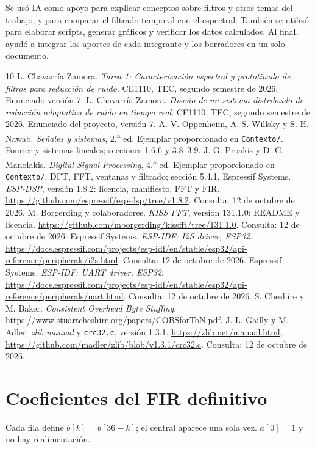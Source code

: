 \documentclass[11pt,a4paper]{article}
\newcommand{\ruta}[1]{\nolinkurl{#1}}
\begin{document}
Se usó IA como apoyo para explicar conceptos sobre filtros y otros temas del trabajo, y para comparar el filtrado temporal con el espectral. También se utilizó para elaborar scripts, generar gráficos y verificar los datos calculados. Al final, ayudó a integrar los aportes de cada integrante y los borradores en un solo documento.

\clearpage
\begin{thebibliography}{10}
 L. Chavarría Zamora. \emph{Tarea 1: Caracterización espectral y prototipado de filtros para reducción de ruido}. CE1110, TEC, segundo semestre de 2026. Enunciado versión 7.
 L. Chavarría Zamora. \emph{Diseño de un sistema distribuido de reducción adaptativa de ruido en tiempo real}. CE1110, TEC, segundo semestre de 2026. Enunciado del proyecto, versión 7.
 A. V. Oppenheim, A. S. Willsky y S. H. Nawab. \emph{Señales y sistemas}, 2.\textsuperscript{a} ed. Ejemplar proporcionado en \ruta{Contexto/}. Fourier y sistemas lineales; secciones 1.6.6 y 3.8--3.9.
 J. G. Proakis y D. G. Manolakis. \emph{Digital Signal Processing}, 4.\textsuperscript{a} ed. Ejemplar proporcionado en \ruta{Contexto/}. DFT, FFT, ventanas y filtrado; sección 5.4.1.
 Espressif Systems. \emph{ESP-DSP}, versión 1.8.2: licencia, manifiesto, FFT y FIR. \url{https://github.com/espressif/esp-dsp/tree/v1.8.2}. Consulta: 12 de octubre de 2026.
 M. Borgerding y colaboradores. \emph{KISS FFT}, versión 131.1.0: README y licencia. \url{https://github.com/mborgerding/kissfft/tree/131.1.0}. Consulta: 12 de octubre de 2026.
 Espressif Systems. \emph{ESP-IDF: I2S driver, ESP32}. \url{https://docs.espressif.com/projects/esp-idf/en/stable/esp32/api-reference/peripherals/i2s.html}. Consulta: 12 de octubre de 2026.
 Espressif Systems. \emph{ESP-IDF: UART driver, ESP32}. \url{https://docs.espressif.com/projects/esp-idf/en/stable/esp32/api-reference/peripherals/uart.html}. Consulta: 12 de octubre de 2026.
 S. Cheshire y M. Baker. \emph{Consistent Overhead Byte Stuffing}. \url{https://www.stuartcheshire.org/papers/COBSforToN.pdf}.
 J. L. Gailly y M. Adler. \emph{zlib manual} y \ruta{crc32.c}, versión 1.3.1. \url{https://zlib.net/manual.html}; \url{https://github.com/madler/zlib/blob/v1.3.1/crc32.c}. Consulta: 12 de octubre de 2026.
\end{thebibliography}
\clearpage
\appendix
\section{Coeficientes del FIR definitivo}
Cada fila define $b[k]=b[36-k]$; el central aparece una sola vez. $a[0]=1$ y no hay realimentación.
\begin{center}\small\end{center}
\end{document}
